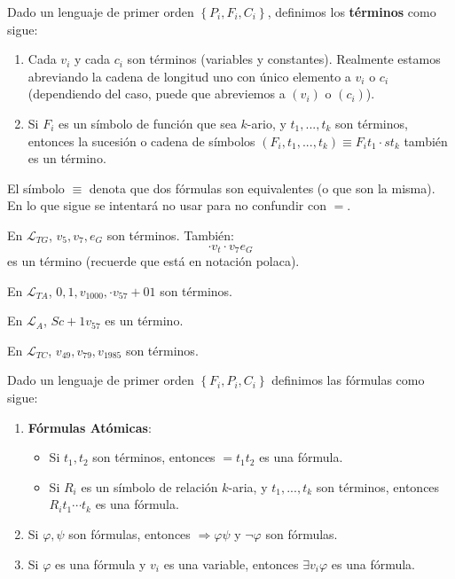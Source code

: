 \documentclass[12pt]{report}
\newcounter{it}
\theoremstyle{largebreak}
\begin{document}
    \begin{mydef}
        Dado un lenguaje de primer orden $\left\{P_i,F_i,C_i \right\}$, definimos los \textbf{términos} como sigue:
        \begin{enumerate}
            \item Cada $v_i$ y cada $c_i$ son términos (variables y constantes). Realmente estamos abreviando la cadena de longitud uno con único elemento a $v_i$ o $c_i$ (dependiendo del caso, puede que abreviemos a $(v_i)$ o $(c_i)$).
            \item Si $F_i$ es un símbolo de función que sea $k$-ario, y $t_1,...,t_k$ son términos, entonces la sucesión o cadena de símbolos $(F_i,t_1,...,t_k)\equiv F_it_1\cdot st_k$ también es un término.
        \end{enumerate}
    \end{mydef}

    \begin{obs}
        El símbolo $\equiv$ denota que dos fórmulas son equivalentes (o que son la misma). En lo que sigue se intentará no usar para no confundir con $=$.
    \end{obs}

    \begin{exa}
        En $\mathcal{L}_{TG}$, $v_5,v_7,e_G$ son términos. También:
        \begin{equation*}
            \cdot v_t\cdot v_7 e_G
        \end{equation*}
        es un término (recuerde que está en notación polaca).

        En $\mathcal{L}_{ TA}$, $0,1,v_{1000},\cdot v_{57}+01$ son términos.

        En $\mathcal{L}_A$, $Sc+1v_{ 57}$ es un término.

        En $\mathcal{L}_{ TC}$, $v_{49},v_{79},v_{ 1985}$ son términos.
    \end{exa}

    \begin{mydef}
        Dado un lenguaje de primer orden $\left\{F_i,P_i,C_i \right\}$ definimos las fórmulas como sigue:
        \begin{enumerate}
            \item \textbf{Fórmulas Atómicas}:
            \begin{itemize}
                \item Si $t_1,t_2$ son términos, entonces $=t_1t_2$ es una fórmula.
                \item Si $R_i$ es un símbolo de relación $k$-aria, y $t_1,...,t_k$ son términos, entonces $R_it_1\cdots t_k$ es una fórmula.
            \end{itemize}
            \item Si $\varphi,\psi$ son fórmulas, entonces $\Rightarrow\varphi\psi$ y $\neg\varphi$ son fórmulas.
            \item Si $\varphi$ es una fórmula y $v_i$ es una variable, entonces $\exists v_i\varphi$ es una fórmula.
        \end{enumerate}
    \end{mydef}
\end{document}
